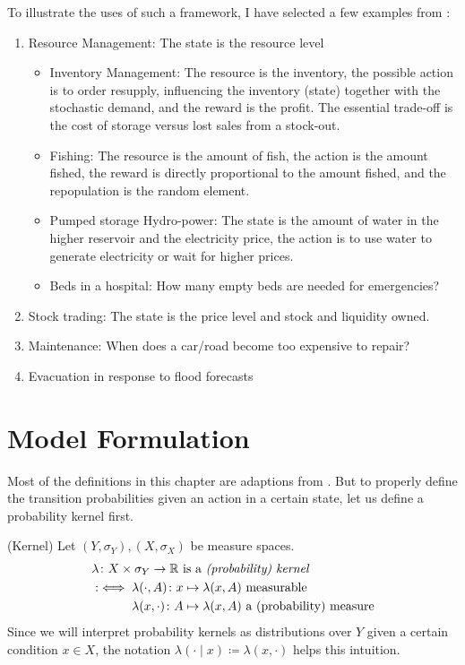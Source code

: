 To illustrate the uses of such a framework, I have selected a few examples from \textcite{whiteRealApplicationsMarkov1985}:
\begin{enumerate}
	\item Resource Management: The state is the resource level
	\begin{itemize}
		\item Inventory Management: The resource is the inventory, the possible action is to order resupply, influencing the inventory (state) together with the stochastic demand, and the reward is the profit. The essential trade-off is the cost of storage versus lost sales from a stock-out.
		\item Fishing: The resource is the amount of fish, the action is the amount fished, the reward is directly proportional to the amount fished, and the repopulation is the random element.
		\item Pumped storage Hydro-power: The state is the amount of water in the higher reservoir and the electricity price, the action is to use water to generate electricity or wait for higher prices.
		\item Beds in a hospital: How many empty beds are needed for emergencies?
	\end{itemize}
	\item Stock trading: The state is the price level and stock and liquidity owned.
	\item Maintenance: When does a car/road become too expensive to repair?
	\item Evacuation in response to flood forecasts
\end{enumerate}

\section{Model Formulation}
Most of the definitions in this chapter are adaptions from \textcite{szepesvariAlgorithmsReinforcementLearning2010}.
But to properly define the transition probabilities given an action in a certain state, let us define a probability kernel first.

\begin{definition}(Kernel)
	Let \((Y,\sigma_Y), (X,\sigma_X)\) be measure spaces.
	 \begin{align*}
	 &\lambda\colon X\times\sigma_Y\to \mathbb{R} \text{ is a \emph{(probability) kernel}}\\
	 &:\iff \begin{aligned}[t]
	 &\lambda(\cdot,A)\colon x\mapsto \lambda(x,A) \text{ measurable}\\
	 &\lambda(x,\cdot)\colon A\mapsto \lambda(x,A) \text{ a (probability) measure}
	 \end{aligned}
	  \end{align*}
	  Since we will interpret probability kernels as distributions over \(Y\) given a  certain condition \(x\in X\), the notation \(\lambda(\cdot\mid x) \coloneqq \lambda(x,\cdot)\) helps this intuition. 
\end{definition}

